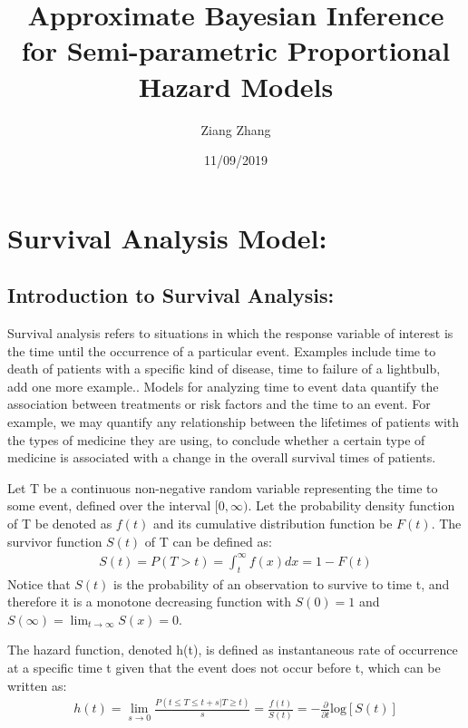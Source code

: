 \documentclass[]{article}
\title{Approximate Bayesian Inference for Semi-parametric Proportional Hazard
Models}
\author{Ziang Zhang}
\date{11/09/2019}
\begin{document}
\maketitle

\hypertarget{survival-analysis-model}{%
\section{Survival Analysis Model:}\label{survival-analysis-model}}

\hypertarget{introduction-to-survival-analysis}{%
\subsection{Introduction to Survival
Analysis:}\label{introduction-to-survival-analysis}}

Survival analysis refers to situations in which the response variable of
interest is the time until the occurrence of a particular event.
Examples include time to death of patients with a specific kind of
disease, time to failure of a lightbulb, add one more example.. Models
for analyzing time to event data quantify the association between
treatments or risk factors and the time to an event. For example, we may
quantify any relationship between the lifetimes of patients with the
types of medicine they are using, to conclude whether a certain type of
medicine is associated with a change in the overall survival times of
patients.

Let T be a continuous non-negative random variable representing the time
to some event, defined over the interval \([0,\infty)\). Let the
probability density function of T be denoted as \(f(t)\) and its
cumulative distribution function be \(F(t)\). The survivor function
\(S(t)\) of T can be defined as:
\begin{equation}\begin{aligned}\label{eqn:survivor}
S(t) = P(T > t) = \int_{t}^{\infty} f(x) dx = 1- F(t)
\end{aligned}\end{equation} Notice that \(S(t)\) is the probability of
an observation to survive to time t, and therefore it is a monotone
decreasing function with \(S(0) = 1\) and
\(S(\infty) = \lim_{t\to\infty} S(x) = 0\).

The hazard function, denoted h(t), is defined as instantaneous rate of
occurrence at a specific time t given that the event does not occur
before t, which can be written as:
\begin{equation}\begin{aligned}\label{eqn:hazard}
h(t) = \lim_{s\to 0} \frac{P(t\le T \le t+s |T\ge t)}{s} = \frac{f(t)}{S(t)} = -\frac{\partial}{\partial t}\text{log}[S(t)]
\end{aligned}\end{equation}
\end{document}
